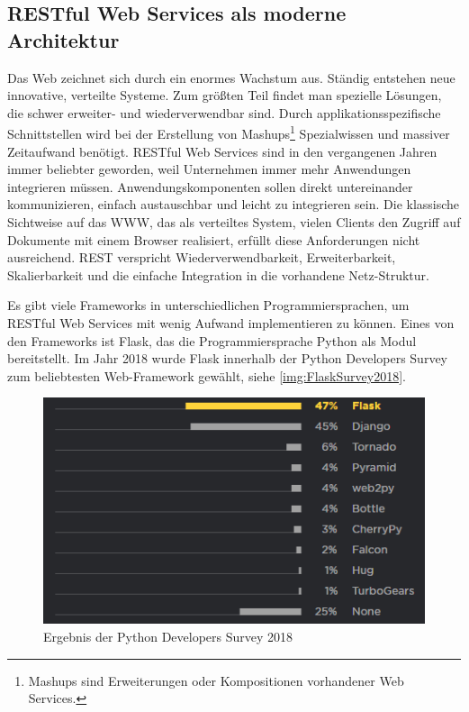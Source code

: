 \documentclass[a4paper,titlepage,halfparskip,12pt,listof=numbered]{scrreprt}
\begin{document}
\begin{onehalfspacing}

\pagestyle{fancyheadlines}

\chapter{RESTful Web Services als moderne Architektur}
\label{chap:Einleitung}

Das Web zeichnet sich durch ein enormes Wachstum aus. Ständig entstehen neue innovative, verteilte Systeme. Zum
größten Teil findet man spezielle Lösungen, die schwer erweiter- und
wiederverwendbar sind. Durch applikationsspezifische Schnittstellen wird
bei der Erstellung von Mashups\footnote{Mashups sind Erweiterungen oder Kompositionen vorhandener Web Services.\cite{mashupDefinition}} Spezialwissen und massiver Zeitaufwand
benötigt. RESTful Web Services sind in den vergangenen Jahren immer beliebter geworden, weil Unternehmen immer mehr Anwendungen integrieren müssen. Anwendungskomponenten sollen direkt untereinander kommunizieren, einfach austauschbar und leicht zu integrieren sein. Die klassische Sichtweise auf das \ac{WWW}, das als verteiltes System, vielen Clients den Zugriff auf Dokumente mit einem Browser realisiert, erfüllt diese Anforderungen nicht ausreichend. \ac{REST} verspricht
Wiederverwendbarkeit, Erweiterbarkeit, Skalierbarkeit und die einfache
Integration in die vorhandene Netz-Struktur.\cite[S.1]{dazerRESTUeberblick}

Es gibt viele Frameworks in unterschiedlichen Programmiersprachen, um RESTful Web Services mit wenig Aufwand implementieren zu können. Eines von den Frameworks ist Flask, das die Programmiersprache Python als Modul bereitstellt. Im Jahr 2018 wurde Flask innerhalb der Python Developers Survey \cite{pythonDeveloperSurvey2018} zum beliebtesten Web-Framework gewählt, siehe \autoref{img:FlaskSurvey2018}.

\begin{figure}[h]
	\centering
	\includegraphics[width=.5\linewidth]{images/FlaskSurvey2018}
	\caption{Ergebnis der Python Developers Survey 2018 \cite{pythonDeveloperSurvey2018}}
	\label{img:FlaskSurvey2018}
\end{figure}


\end{onehalfspacing}
\end{document}
